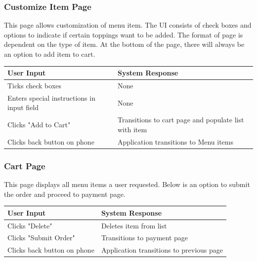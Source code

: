 \documentclass[12pt, titlepage]{article}
\begin{document}
\subsubsection{Customize Item Page}
This page allows customization of menu item. The UI consists of check boxes and options to indicate if certain toppings want to be added. The format of page is dependent on the type of item. At the bottom of the page, there will always be an option to add item to cart. 

\begin{center}
    \begin{tabular}{ | l | p{8cm} |}
    \hline
    User Input & System Response \\ \hline
    Ticks check boxes & None \\ \hline
    Enters special instructions in input field & None \\ \hline
    Clicks "Add to Cart" & Transitions to cart page and populate list with item \\ \hline
    Clicks back button on phone & Application transitions to Menu items \\
    \hline
    \end{tabular}
\end{center}

\subsubsection{Cart Page}
This page displays all menu items a user requested. Below is an option to submit the order and proceed to payment page. 
\begin{center}
    \begin{tabular}{ | l | p{10cm} |}
    \hline
    User Input & System Response \\ \hline
 	Clicks "Delete" &  Deletes item from list\\ \hline
    Clicks "Submit Order" &  Transitions to payment page\\ \hline
    Clicks back button on phone & Application transitions to previous page \\
    \hline
    \end{tabular}
\end{center}
\end{document}
